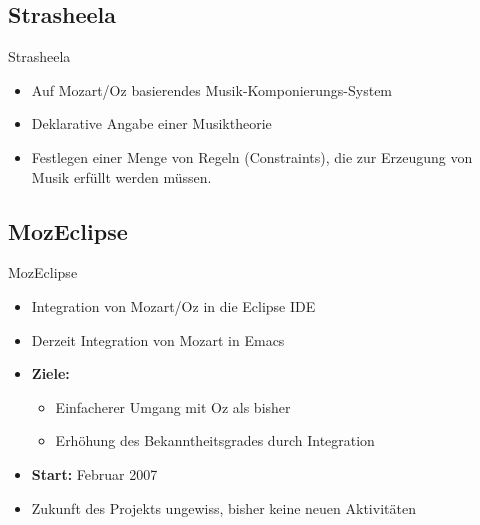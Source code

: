 \subsection{Strasheela}
\begin{frame}{Strasheela}
  \begin{itemize}
    \item Auf Mozart/Oz basierendes Musik-Komponierungs-System
    \item Deklarative Angabe einer Musiktheorie
    \item Festlegen einer Menge von Regeln (Constraints), die zur Erzeugung von 
    Musik erfüllt werden müssen.
  \end{itemize}
\end{frame}

\subsection{MozEclipse}
\begin{frame}{MozEclipse}
  \begin{itemize}
  \item Integration von Mozart/Oz in die Eclipse IDE
  \item Derzeit Integration von Mozart in Emacs
  \item \textbf{Ziele:}
  \begin{itemize}
    \item Einfacherer Umgang mit Oz als bisher
    \item Erhöhung des Bekanntheitsgrades durch Integration
  \end{itemize}
  \item \textbf{Start:} Februar 2007
  \item Zukunft des Projekts ungewiss, bisher keine neuen Aktivitäten
\end{itemize}
\end{frame}